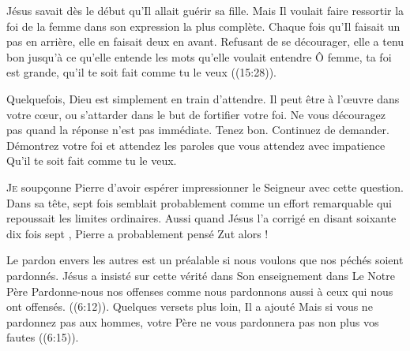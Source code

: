 
Jésus savait dès le début qu'Il allait guérir sa fille.
 Mais Il voulait faire ressortir la foi de la femme dans son expression
 la plus complète. Chaque fois qu'Il faisait un pas en arrière,
 elle en faisait deux en avant. Refusant de se décourager,
 elle a tenu bon jusqu'à ce qu'elle entende les mots
 qu'elle voulait entendre\frcolon{} 
 \Og Ô femme, ta foi est grande, qu'il te soit fait comme tu le veux \Fg{}
 ((15:28)). 

Quelquefois, Dieu est simplement en train d'attendre.
 Il peut être à l'\oe{}uvre dans votre c\oe{}ur, ou s'attarder dans le but
 de fortifier votre foi. Ne vous découragez pas quand la réponse
 n'est pas immédiate. Tenez bon. Continuez de  demander.
 Démontrez votre foi et attendez les paroles que vous attendez
 avec impatience\frcolon{} 
 \Og Qu'il te soit fait comme tu le veux. \Fg{}

\dvrule






\lettrine{J}{e} soup\c{c}onne Pierre d'avoir espérer impressionner le Seigneur
 avec cette question. Dans sa tête, \Og sept fois \Fg{} semblait probablement
 comme un effort remarquable qui repoussait les limites ordinaires.
 Aussi quand Jésus l'a corrigé en disant \Og soixante dix fois sept \Fg{},
 Pierre a probablement pensé\frcolon{} \Og Zut alors ! \Fg{}

Le pardon envers les autres est un préalable si nous voulons
 que nos péchés soient pardonnés. Jésus a insisté sur cette vérité
 dans Son enseignement dans \Og Le Notre Père \Fg{}\frcolon{} 
 \Og Pardonne-nous nos offenses comme nous pardonnons aussi
 à ceux qui nous ont offensés. \Fg{} 
 ((6:12)). Quelques versets plus loin, Il a ajouté\frcolon{} 
 \Og Mais si vous ne pardonnez pas aux hommes,
 votre Père ne vous pardonnera pas non plus vos fautes \Fg{} 
 ((6:15)). 

